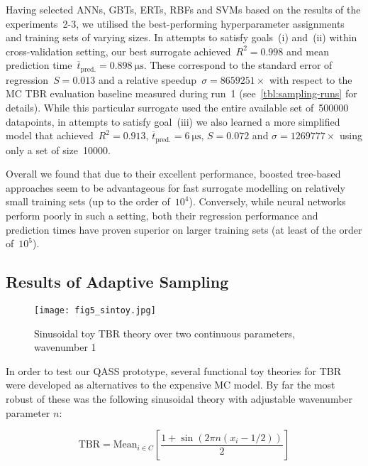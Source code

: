 Having selected ANNs, GBTs, ERTs, RBFs and SVMs based on the results of the
experiments~2-3, we utilised the best-performing hyperparameter
assignments and training sets of varying sizes. In attempts to satisfy
goals~(i) and~(ii) within cross-validation setting, our best surrogate
achieved~$R^2=\num{0.998}$ and mean prediction
time~$\overline{t}_{\text{pred.}}=\SI{0.898}{\micro\second}$. These correspond
to the standard error of regression~$S=\num{0.013}$ and a relative speedup~$\sigma=\num{8659251} \times$
with respect to the MC TBR evaluation baseline measured during run~1
(see~\cref{tbl:sampling-runs} for details). While this particular surrogate
used the entire available set of~\num{500000} datapoints, in attempts to satisfy
goal~(iii) we also learned a more simplified model that achieved~$R^2=\num{0.913}$,
$\overline{t}_{\text{pred.}}=\SI{6}{\micro\second}$, $S=\num{0.072}$ and $\sigma=\num{1269777} \times$
using only a set of size~\num{10000}.

Overall we found that due to their excellent performance, boosted tree-based
approaches seem to be advantageous for fast surrogate modelling on relatively small training
sets (up to the order of~$10^4$). Conversely, while neural networks perform
poorly in such a setting, both their regression performance and prediction times
have proven superior on larger training sets (at least of the order of~$10^5$).


\subsection{Results of Adaptive Sampling}
\label{sec:adaptiveres}

\begin{wrapfigure}{r}{0.4\textwidth}
  \vspace{-60pt}
  \begin{center}
    \texttt{[image: fig5\_sintoy.jpg]}
	\caption{Sinusoidal toy TBR theory over two continuous parameters, wavenumber 1}
    \label{fig:sintoy}
  \end{center}
  \vspace{-10pt}
\end{wrapfigure}

In order to test our QASS prototype, several functional toy theories for TBR were developed as alternatives to the expensive MC model. By far the most robust of these was the following sinusoidal theory with adjustable wavenumber parameter $n$:

\begin{equation}
	\text{TBR} = \text{Mean}_{i \in C} \left[ \frac{1 + \sin(2\pi n (x_i - 1/2)) }{2} \right]
\end{equation}

